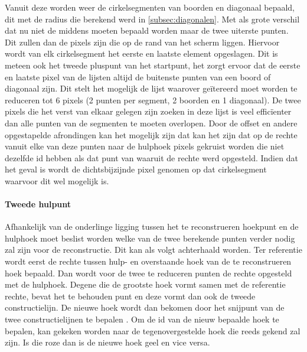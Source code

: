 		Vanuit deze worden weer de cirkelsegmenten van boorden en diagonaal bepaald, dit met de radius die berekend werd in \ref{subsec:diagonalen}. Met als grote verschil dat nu niet de middens moeten bepaald worden maar de twee uiterste punten. Dit zullen dan de pixels zijn die op de rand van het scherm liggen. Hiervoor wordt van elk cirkelsegment het eerste en laatste element opgeslagen. Dit is meteen ook het tweede pluspunt van het startpunt, het zorgt ervoor dat de eerste en laatste pixel van de lijsten altijd de buitenste punten van een boord of diagonaal zijn. Dit stelt het mogelijk de lijst waarover geïtereerd moet worden te reduceren tot 6 pixels (2 punten per segment, 2 boorden en 1 diagonaal). De twee pixels die het verst van elkaar gelegen zijn zoeken in deze lijst is veel efficïenter dan alle punten van de segmenten te moeten overlopen. Door de offset en andere opgestapelde afrondingen kan het mogelijk zijn dat  kan het zijn dat op de rechte vanuit elke van deze punten naar de hulphoek pixels gekruist worden die niet dezelfde id hebben als dat punt van waaruit de rechte werd opgesteld. Indien dat het geval is wordt de dichtsbijzijnde pixel genomen op dat cirkelsegment waarvoor dit wel mogelijk is. \paragraph{Tweede hulpunt} Afhankelijk van de onderlinge ligging tussen het te reconstrueren hoekpunt en de hulphoek moet beslist worden welke van de twee berekende punten verder nodig zal zijn voor de reconstructie. Dit kan als volgt achterhaald worden. Ter referentie wordt eerst de rechte tussen hulp- en overstaande hoek van de te reconstrueren hoek bepaald. Dan wordt voor de twee te reduceren punten de rechte opgesteld met de hulphoek. Degene die de grootste hoek vormt samen met de referentie rechte, bevat het te behouden punt en deze vormt dan ook de tweede constructielijn. De nieuwe hoek wordt dan bekomen door het snijpunt van de twee constructielijnen te bepalen \cite{intersectie}. Om de id van de nieuw bepaalde hoek te bepalen, kan gekeken worden naar de tegenovergestelde hoek die reeds gekend zal zijn. Is die roze dan is de nieuwe hoek geel en vice versa. 
		
